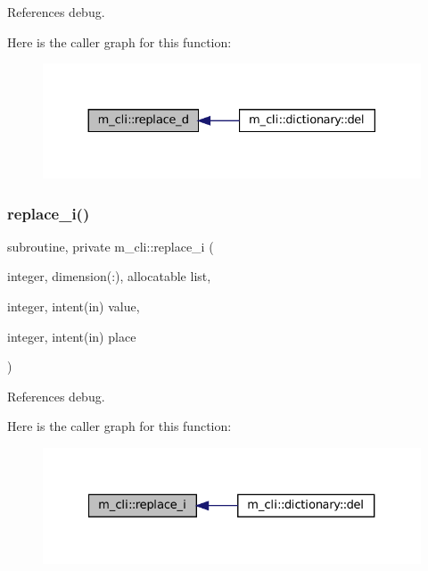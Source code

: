 References debug.

Here is the caller graph for this function\+:
\nopagebreak
\begin{figure}[H]
\begin{center}
\leavevmode
\includegraphics[width=330pt]{namespacem__cli_aa9b7d672cc9fb0bc79fd09a2870614f5_icgraph}
\end{center}
\end{figure}
\mbox{\label{namespacem__cli_ac609c48bb1f904235b8cbf8bea61473f}} 
\subsubsection{\texorpdfstring{replace\+\_\+i()}{replace\_i()}}
{\footnotesize\ttfamily subroutine, private m\+\_\+cli\+::replace\+\_\+i (\begin{DoxyParamCaption}\item[{integer, dimension(\+:), allocatable}]{list,  }\item[{integer, intent(in)}]{value,  }\item[{integer, intent(in)}]{place }\end{DoxyParamCaption})\hspace{0.3cm}{\ttfamily [private]}}



References debug.

Here is the caller graph for this function\+:
\nopagebreak
\begin{figure}[H]
\begin{center}
\leavevmode
\includegraphics[width=327pt]{namespacem__cli_ac609c48bb1f904235b8cbf8bea61473f_icgraph}
\end{center}
\end{figure}
\mbox{\label{namespacem__cli_a89ed5c3b944f91d8135173206fbc7e07}} 
